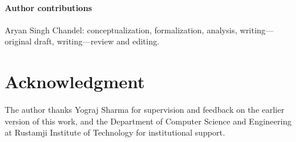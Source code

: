 \documentclass{svjour3}
\begin{document}
\paragraph{Author contributions} Aryan Singh Chandel: conceptualization, formalization, analysis, writing---original draft, writing---review and editing.

\section*{Acknowledgment}
The author thanks Yograj Sharma for supervision and feedback on the earlier version of this work, and the Department of Computer Science and Engineering at Rustamji Institute of Technology for institutional support.



\end{document}

